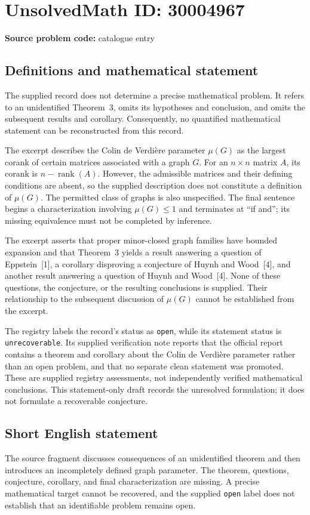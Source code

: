 \documentclass[11pt]{article}
\begin{document}
\section*{UnsolvedMath ID: 30004967}
\textbf{Source problem code:} catalogue entry
\subsection{Definitions and mathematical statement}
The supplied record does not determine a precise mathematical problem. It refers to an unidentified Theorem~3, omits its hypotheses and conclusion, and omits the subsequent results and corollary. Consequently, no quantified mathematical statement can be reconstructed from this record.

The excerpt describes the Colin de Verdi\`ere parameter \(\mu(G)\) as the largest corank of certain matrices associated with a graph \(G\). For an \(n\times n\) matrix \(A\), its corank is \(n-\operatorname{rank}(A)\). However, the admissible matrices and their defining conditions are absent, so the supplied description does not constitute a definition of \(\mu(G)\). The permitted class of graphs is also unspecified. The final sentence begins a characterization involving \(\mu(G)\leq 1\) and terminates at ``if and''; its missing equivalence must not be completed by inference.

The excerpt asserts that proper minor-closed graph families have bounded expansion and that Theorem~3 yields a result answering a question of Eppstein~[1], a corollary disproving a conjecture of Huynh and Wood~[4], and another result answering a question of Huynh and Wood~[4]. None of these questions, the conjecture, or the resulting conclusions is supplied. Their relationship to the subsequent discussion of \(\mu(G)\) cannot be established from the excerpt.

The registry labels the record's status as \texttt{open}, while its statement status is \texttt{unrecoverable}. Its supplied verification note reports that the official report contains a theorem and corollary about the Colin de Verdi\`ere parameter rather than an open problem, and that no separate clean statement was promoted. These are supplied registry assessments, not independently verified mathematical conclusions. This statement-only draft records the unresolved formulation; it does not formulate a recoverable conjecture.
\subsection{Short English statement}
The source fragment discusses consequences of an unidentified theorem and then introduces an incompletely defined graph parameter. The theorem, questions, conjecture, corollary, and final characterization are missing. A precise mathematical target cannot be recovered, and the supplied \texttt{open} label does not establish that an identifiable problem remains open.
\end{document}
